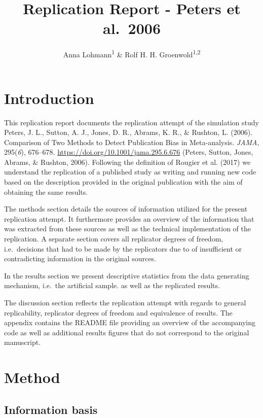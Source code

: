 \documentclass[
  english,
  doc,floatsintext,draftall]{apa6}
\title{Replication Report - Peters et al.~2006}
\author{Anna Lohmann\textsuperscript{1} \& Rolf H. H. Groenwold\textsuperscript{1,2}}
\date{}
\affiliation{\vspace{0.5cm}\textsuperscript{1,2} Leiden University Medical Center}
\begin{document}
\maketitle

\hypertarget{introduction}{%
\section{Introduction}\label{introduction}}

This replication report documents the replication attempt of the simulation study Peters, J. L., Sutton, A. J., Jones, D. R., Abrams, K. R., \& Rushton, L. (2006). Comparison of Two Methods to Detect Publication Bias in Meta-analysis. \emph{JAMA}, 295(\emph{6}), 676--678. \url{https://doi.org/10.1001/jama.295.6.676} (Peters, Sutton, Jones, Abrams, \& Rushton, 2006).
Following the definition of Rougier et al. (2017) we understand the replication of a published study as writing and running new code based on the description provided in the original publication with the aim of obtaining the same results.

The methods section details the sources of information utilized for the present replication attempt. It furthermore provides an overview of the information that was extracted from these sources as well as the technical implementation of the replication.
A separate section covers all replicator degrees of freedom, i.e.~decisions that had to be made by the replicators due to of insufficient or contradicting information in the original sources.

In the results section we present descriptive statistics from the data generating mechanism, i.e.~the artificial sample.
as well as the replicated results.

The discussion section reflects the replication attempt with regards to general replicability, replicator degrees of freedom and equivalence of results.
The appendix contains the README file providing an overview of the accompanying code as well as additional results figures that do not correspond to the original manuscript.

\hypertarget{method}{%
\section{Method}\label{method}}

\hypertarget{information-basis}{%
\subsection{Information basis}\label{information-basis}}
\end{document}
